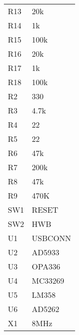 \documentclass{article}
\begin{document}
\begin{center}
\begin{tabular}{ll}
 R13  &  20k      \\
 R14  &  1k       \\
 R15  &  100k     \\
 R16  &  20k      \\
 R17  &  1k       \\
 R18  &  100k     \\
 R2   &  330      \\
 R3   &  4.7k     \\
 R4   &  22       \\
 R5   &  22       \\
 R6   &  47k      \\
 R7   &  200k     \\
 R8   &  47k      \\
 R9   &  470K     \\
 SW1  &  RESET    \\
 SW2  &  HWB      \\
 U1   &  USBCONN  \\
 U2   &  AD5933   \\
 U3   &  OPA336   \\
 U4   &  MC33269  \\
 U5   &  LM358    \\
 U6   &  AD5262   \\
 X1   &  8MHz     \\
\end{tabular}
\end{center}
\end{document}
